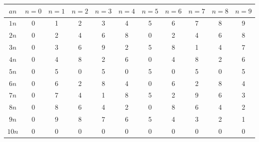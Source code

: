 \documentclass[11pt]{scrartcl}
\begin{document}
\begin{soaljawab}
\begin{solusi}
        \begin{tabular}{|c|cccccccccc|}
        \hline
        \textbf{$an$} & \textbf{$n=0$} & \textbf{$n=1$} & \textbf{$n=2$} & \textbf{$n=3$} & \textbf{$n=4$} & \textbf{$n=5$} & \textbf{$n=6$} & \textbf{$n=7$} & \textbf{$n=8$} & \textbf{$n=9$} \\
        \hline
        $1n$ & 0 & 1 & 2 & 3 & 4 & 5 & 6 & 7 & 8 & 9 \\
        $2n$ & 0 & 2 & 4 & 6 & 8 & 0 & 2 & 4 & 6 & 8 \\
        $3n$ & 0 & 3 & 6 & 9 & 2 & 5 & 8 & 1 & 4 & 7 \\
        $4n$ & 0 & 4 & 8 & 2 & 6 & 0 & 4 & 8 & 2 & 6 \\
        $5n$ & 0 & 5 & 0 & 5 & 0 & 5 & 0 & 5 & 0 & 5 \\
        $6n$ & 0 & 6 & 2 & 8 & 4 & 0 & 6 & 2 & 8 & 4 \\
        $7n$ & 0 & 7 & 4 & 1 & 8 & 5 & 2 & 9 & 6 & 3 \\
        $8n$ & 0 & 8 & 6 & 4 & 2 & 0 & 8 & 6 & 4 & 2 \\
        $9n$ & 0 & 9 & 8 & 7 & 6 & 5 & 4 & 3 & 2 & 1 \\
        $10n$ & 0 & 0 & 0 & 0 & 0 & 0 & 0 & 0 & 0 & 0 \\
        \hline
        \end{tabular}

    \end{solusi}
\end{soaljawab}
\end{document}
